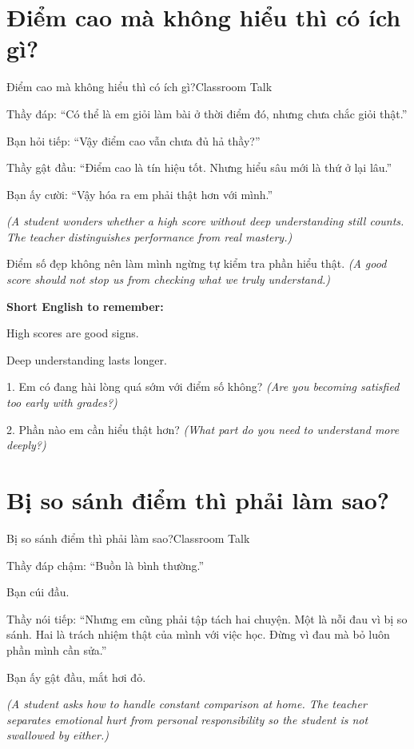 \section{Điểm cao mà không hiểu thì có ích gì?}
\begin{truyen}{Điểm cao mà không hiểu thì có ích gì?}{Classroom Talk}

Thầy đáp: ``Có thể là em giỏi làm bài ở thời điểm đó, nhưng chưa chắc giỏi thật.''

Bạn hỏi tiếp: ``Vậy điểm cao vẫn chưa đủ hả thầy?''

Thầy gật đầu: ``Điểm cao là tín hiệu tốt. Nhưng hiểu sâu mới là thứ ở lại lâu.''

Bạn ấy cười: ``Vậy hóa ra em phải thật hơn với mình.''

\textit{(A student wonders whether a high score without deep understanding still counts. The teacher distinguishes performance from real mastery.)}
\end{truyen}

\begin{baihoc}
Điểm số đẹp không nên làm mình ngừng tự kiểm tra phần hiểu thật.
\textit{(A good score should not stop us from checking what we truly understand.)}
\end{baihoc}

\begin{ghinhoanh}
\textbf{Short English to remember:}

High scores are good signs.

Deep understanding lasts longer.
\end{ghinhoanh}

\begin{tuhocnhanh}
1. Em có đang hài lòng quá sớm với điểm số không? \textit{(Are you becoming satisfied too early with grades?)}

2. Phần nào em cần hiểu thật hơn? \textit{(What part do you need to understand more deeply?)}
\end{tuhocnhanh}
\ngancach

\section{Bị so sánh điểm thì phải làm sao?}
\begin{truyen}{Bị so sánh điểm thì phải làm sao?}{Classroom Talk}

Thầy đáp chậm: ``Buồn là bình thường.''

Bạn cúi đầu.

Thầy nói tiếp: ``Nhưng em cũng phải tập tách hai chuyện. Một là nỗi đau vì bị so sánh. Hai là trách nhiệm thật của mình với việc học. Đừng vì đau mà bỏ luôn phần mình cần sửa.''

Bạn ấy gật đầu, mắt hơi đỏ.

\textit{(A student asks how to handle constant comparison at home. The teacher separates emotional hurt from personal responsibility so the student is not swallowed by either.)}
\end{truyen}


